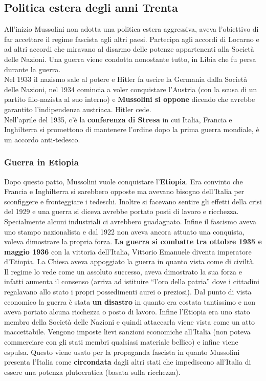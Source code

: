 \subsection{Politica estera degli anni Trenta}
All'inizio Mussolini non adotta una politica estera aggressiva, aveva l'obiettivo di far accettare il
regime fascista agli altri paesi. Partecipa agli accordi di Locarno e ad altri accordi che miravano
al disarmo delle potenze appartenenti alla Società delle Nazioni. Una guerra viene condotta 
nonostante tutto, in Libia che fu persa durante la guerra.\\
Nel 1933 il nazismo sale al potere e Hitler fa uscire la Germania dalla Società delle Nazioni, nel
1934 comincia a voler conquistare l'Austria (con la scusa di un partito filo-nazista al suo interno)
e \textbf{Mussolini si oppone} dicendo che avrebbe garantito l'indipendenza austriaca. Hitler cede.\\
Nell'aprile del 1935, c'è la \textbf{conferenza di Stresa} in cui Italia, Francia e Inghilterra si
promettono di mantenere l'ordine dopo la prima guerra mondiale, è un accordo anti-tedesco.

\subsubsection{Guerra in Etiopia}
Dopo questo patto, Mussolini vuole conquistare l'\textbf{Etiopia}. Era convinto che Francia e 
Inghilterra si sarebbero opposte ma avevano bisogno dell'Italia per sconfiggere e fronteggiare i 
tedeschi. Inoltre si facevano sentire gli effetti della crisi del 1929 e una guerra si diceva avrebbe
portato posti di lavoro e ricchezza. Specialmente alcuni industriali ci avrebbero guadagnato. Infine
il fascismo aveva uno stampo nazionalista e dal 1922 non aveva ancora attuato una conquista, voleva
dimostrare la propria forza. \textbf{La guerra si combatte tra ottobre 1935 e maggio 1936} con la 
vittoria dell'Italia, Vittorio Emanuele  diventa imperatore d'Etiopia. La Chiesa aveva 
appoggiato la guerra in quanto vista come di civiltà.\\ [\baselineskip]
Il regime lo vede come un assoluto successo, aveva dimostrato la sua forza e infatti aumenta il
consenso (arriva ad istituire ``l'oro della patria'' dove i cittadini regalavano allo stato i propri
possedimenti aurei o preziosi). Dal punto di vista economico la guerra è stata \textbf{un disastro}
in quanto era costata tantissimo e non aveva portato alcuna ricchezza o posto di lavoro. Infine
l'Etiopia era uno stato membro della Società delle Nazioni e quindi attaccarla viene vista come un
atto inaccettabile. Vengono imposte lievi sanzioni economiche all'Italia (non poteva commerciare con
gli stati membri qualsiasi materiale bellico) e infine viene espulsa. Questo viene usato per la
propaganda fascista in quanto Mussolini presenta l'Italia come \textbf{circondata} dagli altri stati
che impediscono all'Italia di essere una potenza plutocratica (basata sulla ricchezza).

